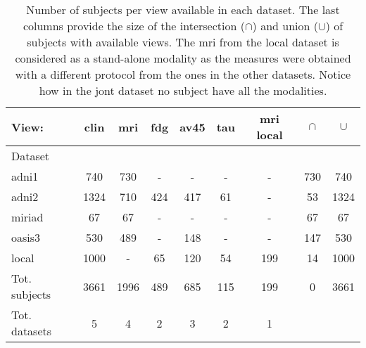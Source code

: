 \begin{table*}[!t]
\caption{
Number of subjects per view available in each dataset.
The last columns provide the size of the intersection ($\cap$) and union ($\cup$) of subjects with available views.
The mri from the local dataset is considered as a stand-alone modality as the measures were obtained with a different protocol from the ones in the other datasets.
Notice how in the jont dataset no subject have all the modalities.
}
\centering
\begin{tabular}{lcccccc|cc}
\toprule
View: &    clin &   mri &  fdg & av45 &  tau & mri local & $\cap$ & $\cup$ \\
\midrule
Dataset \\
adni1          &   740 &   730 &    - &    - &    - &          - & 730 &  740 \\
adni2          &  1324 &   710 &  424 &  417 &   61 &          - &  53 & 1324 \\
miriad         &    67 &    67 &    - &    - &    - &          - &  67 &   67 \\
oasis3         &   530 &   489 &    - &  148 &    - &          - & 147 &  530 \\
local          &  1000 &     - &   65 &  120 &   54 &        199 &  14 & 1000 \\
\midrule
Tot. subjects  &  3661 &  1996 &  489 &  685 &  115 &        199 &   0 & 3661 \\
\midrule
Tot. datasets  & 5     & 4     & 2    & 3    & 2    & 1          &     &      \\
\bottomrule
\end{tabular}
\label{table:datasets}
\end{table*}
